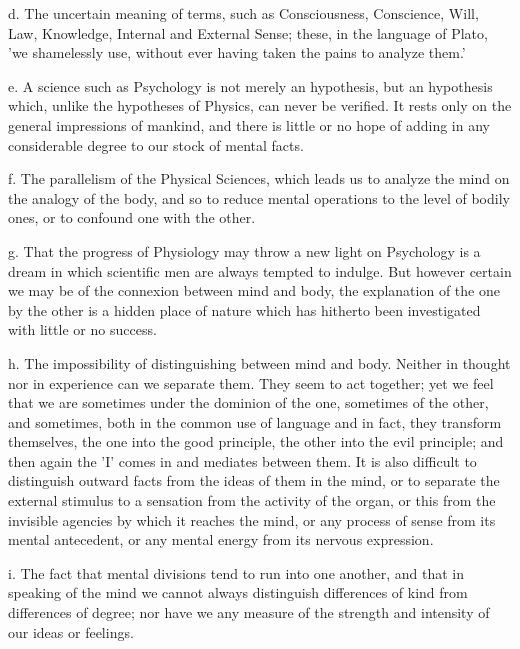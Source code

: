 \documentclass[11pt,letter]{article}
\begin{document}
\par  d. The uncertain meaning of terms, such as Consciousness, Conscience, Will, Law, Knowledge, Internal and External Sense; these, in the language of Plato, 'we shamelessly use, without ever having taken the pains to analyze them.'

\par  e. A science such as Psychology is not merely an hypothesis, but an hypothesis which, unlike the hypotheses of Physics, can never be verified. It rests only on the general impressions of mankind, and there is little or no hope of adding in any considerable degree to our stock of mental facts.

\par  f. The parallelism of the Physical Sciences, which leads us to analyze the mind on the analogy of the body, and so to reduce mental operations to the level of bodily ones, or to confound one with the other.

\par  g. That the progress of Physiology may throw a new light on Psychology is a dream in which scientific men are always tempted to indulge. But however certain we may be of the connexion between mind and body, the explanation of the one by the other is a hidden place of nature which has hitherto been investigated with little or no success.

\par  h. The impossibility of distinguishing between mind and body. Neither in thought nor in experience can we separate them. They seem to act together; yet we feel that we are sometimes under the dominion of the one, sometimes of the other, and sometimes, both in the common use of language and in fact, they transform themselves, the one into the good principle, the other into the evil principle; and then again the 'I' comes in and mediates between them. It is also difficult to distinguish outward facts from the ideas of them in the mind, or to separate the external stimulus to a sensation from the activity of the organ, or this from the invisible agencies by which it reaches the mind, or any process of sense from its mental antecedent, or any mental energy from its nervous expression.

\par  i. The fact that mental divisions tend to run into one another, and that in speaking of the mind we cannot always distinguish differences of kind from differences of degree; nor have we any measure of the strength and intensity of our ideas or feelings.
\end{document}
